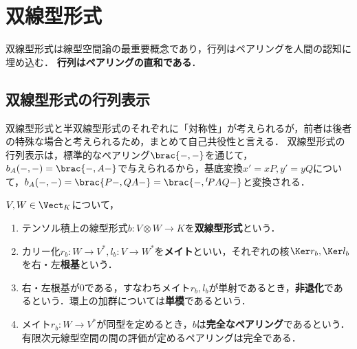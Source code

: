 \documentclass[uplatex, dvipdfmx]{jsreport}
\begin{document}
\section{双線型形式}

\begin{tcolorbox}[colframe=ForestGreen, colback=ForestGreen!10!white,breakable,colbacktitle=ForestGreen!40!white,coltitle=black,fonttitle=\bfseries\sffamily,
title=]
    双線型形式は線型空間論の最重要概念であり，行列はペアリングを人間の認知に埋め込む．
    \textbf{行列はペアリングの直和である}．
\end{tcolorbox}

\subsection{双線型形式の行列表示}

\begin{tcolorbox}[colframe=ForestGreen, colback=ForestGreen!10!white,breakable,colbacktitle=ForestGreen!40!white,coltitle=black,fonttitle=\bfseries\sffamily,
title=]
    双線型形式と半双線型形式のそれぞれに「対称性」が考えられるが，前者は後者の特殊な場合と考えられるため，まとめて自己共役性と言える．
    双線型形式の行列表示は，標準的なペアリング$\brac{-,-}$を通じて，$b_A(-,-)=\brac{-,A-}$で与えられるから，基底変換$x'=xP,y'=yQ$について，$b_A(-,-)=\brac{P-,QA-}=\brac{-,{}^t\!PAQ-}$と変換される．
\end{tcolorbox}

\begin{definition}
    $V,W\in\Vect_K$について，
    \begin{enumerate}
        \item テンソル積上の線型形式$b:V\otimes W\to K$を\textbf{双線型形式}という．
        \item カリー化$r_b:W\to V^*,l_b:V\to W^*$を\textbf{メイト}といい，それぞれの核$\Ker r_b,\Ker l_b$を右・左\textbf{根基}という．
        \item 右・左根基が$0$である，すなわちメイト$r_b,l_b$が単射であるとき，\textbf{非退化}であるという．環上の加群については\textbf{単模}であるという．
        \item メイト$r_b:W\to V^*$が同型を定めるとき，$b$は\textbf{完全なペアリング}であるという．有限次元線型空間の間の評価が定めるペアリングは完全である．
    \end{enumerate}
\end{definition}
\end{document}

